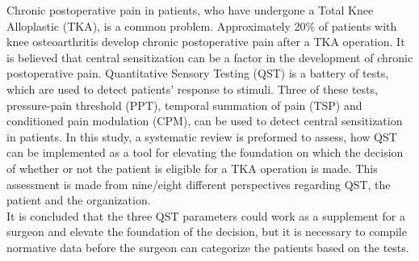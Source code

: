 Chronic postoperative pain in patients, who have undergone a Total Knee Alloplastic (TKA), is a common problem. Approximately 20\% of patients with knee osteoarthritis develop chronic postoperative pain after a TKA operation. It is believed that central sensitization can be a factor in the development of chronic postoperative pain. Quantitative Sensory Testing (QST) is a battery of tests, which are used to detect patients’ response to stimuli. Three of these tests, pressure-pain threshold (PPT), temporal summation of pain (TSP) and conditioned pain modulation (CPM), can be used to detect central sensitization in patients. In this study, a systematic review is preformed to assess, how QST can be implemented as a tool for elevating the foundation on which the decision of whether or not the patient is eligible for a TKA operation is made. This assessment is made from nine/eight different perspectives regarding QST, the patient and the organization. \\
It is concluded that the three QST parameters could work as a supplement for a surgeon and elevate the foundation of the decision, but it is necessary to compile normative data before the surgeon can categorize the patients based on the tests.        
